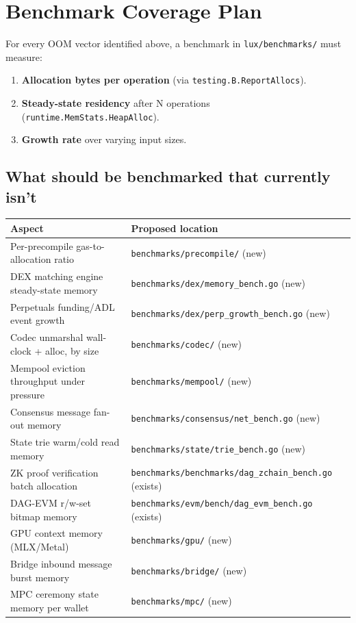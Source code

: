 \documentclass[11pt]{article}
\begin{document}
\section{Benchmark Coverage Plan}

For every OOM vector identified above, a benchmark in
\texttt{lux/benchmarks/} must measure:

\begin{enumerate}
  \item \textbf{Allocation bytes per operation} (via
    \verb|testing.B.ReportAllocs|).
  \item \textbf{Steady-state residency} after N operations
    (\verb|runtime.MemStats.HeapAlloc|).
  \item \textbf{Growth rate} over varying input sizes.
\end{enumerate}

\subsection{What should be benchmarked that currently isn't}

\begin{table}[h]
\centering
\small
\begin{tabular}{p{6.5cm}l}
\toprule
\textbf{Aspect} & \textbf{Proposed location} \\
\midrule
Per-precompile gas-to-allocation ratio & \texttt{benchmarks/precompile/} (new) \\
DEX matching engine steady-state memory & \texttt{benchmarks/dex/memory\_bench.go} (new) \\
Perpetuals funding/ADL event growth & \texttt{benchmarks/dex/perp\_growth\_bench.go} (new) \\
Codec unmarshal wall-clock + alloc, by size & \texttt{benchmarks/codec/} (new) \\
Mempool eviction throughput under pressure & \texttt{benchmarks/mempool/} (new) \\
Consensus message fan-out memory & \texttt{benchmarks/consensus/net\_bench.go} (new) \\
State trie warm/cold read memory & \texttt{benchmarks/state/trie\_bench.go} (new) \\
ZK proof verification batch allocation & \texttt{benchmarks/benchmarks/dag\_zchain\_bench.go} (exists) \\
DAG-EVM r/w-set bitmap memory & \texttt{benchmarks/evm/bench/dag\_evm\_bench.go} (exists) \\
GPU context memory (MLX/Metal) & \texttt{benchmarks/gpu/} (new) \\
Bridge inbound message burst memory & \texttt{benchmarks/bridge/} (new) \\
MPC ceremony state memory per wallet & \texttt{benchmarks/mpc/} (new) \\
\bottomrule
\end{tabular}
\end{table}
\end{document}
